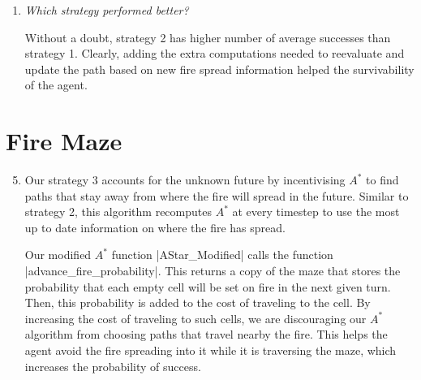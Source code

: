 \documentclass[12pt, twoside]{article}
\begin{document}
\begin{enumerate}
    \item 
        \textit{Which strategy performed better?}

        \vspace{4mm}
        Without a doubt, strategy 2 has higher number of average successes than strategy 1. Clearly, adding the extra computations needed to reevaluate and update the path based on new fire spread information helped the survivability of the agent. 


\end{enumerate}

\section{Fire Maze}
\begin{enumerate}
    \setcounter{enumi}{4}
    \item Our strategy 3 accounts for the unknown future by incentivising $A^*$ to find paths that stay away from where the fire will spread in the future. Similar to strategy 2, this algorithm recomputes $A^*$ at every timestep to use the most up to date information on where the fire has spread. 
    
    \vspace{4mm}
    Our modified $A^*$ function \cverb|AStar_Modified| calls the function \cverb|advance_fire_probability|. This returns a copy of the maze that stores the probability that each empty cell will be set on fire in the next given turn. Then, this probability is added to the cost of traveling to the cell. By increasing the cost of traveling to such cells, we are discouraging our $A^*$ algorithm from choosing paths that travel nearby the fire. This helps the agent avoid the fire spreading into it while it is traversing the maze, which increases the probability of success.
\end{enumerate}
 
 
\end{document}
